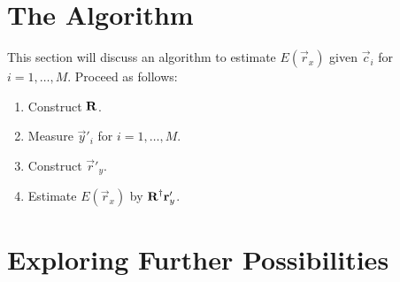 \documentclass[a4paper, openany, oneside]{memoir}
\begin{document}
\section{The Algorithm}
This section will discuss an algorithm to estimate $E(\vec{r}_x)$ given $\vec{c}_i$ for $i = 1,\ldots,M$. Proceed as follows:
\begin{enumerate}
    \item Construct $\boldsymbol{\mathbf{R}}$.
    \item Measure $\vec{y}'_i$ for $i = 1,\ldots,M$.
    \item Construct $\vec{r}'_y$.
    \item Estimate $E(\vec{r}_x)$ by $\boldsymbol{\mathbf{R}}^\dagger\boldsymbol{\mathbf{r}}'_y$.
\end{enumerate}

\section{Exploring Further Possibilities}
\end{document}
